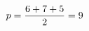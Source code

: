 \documentclass[preview]{standalone}
\begin{document}
\begin{align*}
\special{dvisvgm:raw <g id='unique000'>}p = \frac{6+7+5}{2} = 9\special{dvisvgm:raw </g>}
\end{align*}
\end{document}
